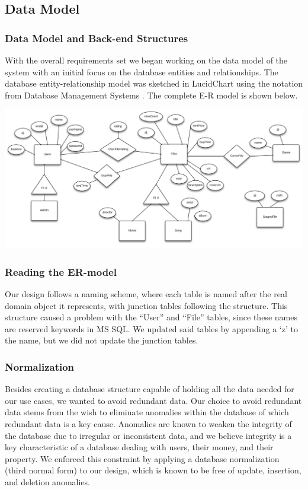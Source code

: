 \subsection{Data Model}
\subsubsection{Data Model and Back-end Structures}
\label{sec:datamodel}

With the overall requirements set we began working on the data model of the system with an initial focus on the database entities and relationships. The database entity-relationship model was sketched in LucidChart using the notation from Database Management Systems \cite{dbbook}. The complete E-R  model is shown below.

\includegraphics[scale=0.5]{./p2Communication/erdmodel.png}

\subsubsection{Reading the ER-model}
\label{sec:readingdatamodel}
Our design follows a naming scheme, where each table is named after the real domain object it represents, with junction tables following the structure.
This structure caused a problem with the “User” and “File” tables, since these names are reserved keywords in MS SQL. We updated said tables by appending a ‘z’ to the name, but we did not update the junction tables.

\subsubsection{Normalization}
\label{sec:normalization}
Besides creating a database structure capable of holding all the data needed for our use cases, we wanted to avoid redundant data. Our choice to avoid redundant data stems from the wish to eliminate anomalies within the database of which redundant data is a key cause. Anomalies are known to weaken the integrity of the database \cite{dbbook} due to irregular or inconsistent data, and we believe integrity is a key characteristic of a database dealing with users, their money, and their property. We enforced this constraint by applying a database normalization (third normal form) to our design, which is known to be free of update, insertion, and deletion anomalies.


